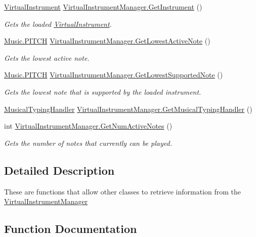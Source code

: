\begin{DoxyCompactItemize}
\hyperlink{class_virtual_instrument}{Virtual\+Instrument} \hyperlink{group___v_i_m_pub_func_gac39a3e411417dc010f0e4fd8f146fbc3}{Virtual\+Instrument\+Manager.\+Get\+Instrument} ()
\begin{DoxyCompactList}\small\item\em Gets the loaded \hyperlink{class_virtual_instrument}{Virtual\+Instrument}. \end{DoxyCompactList}\item 
\hyperlink{group___music_enums_ga508f69b199ea518f935486c990edac1d}{Music.\+P\+I\+T\+CH} \hyperlink{group___v_i_m_pub_func_ga09bfbd0756fc8110c877e5b59c104bcd}{Virtual\+Instrument\+Manager.\+Get\+Lowest\+Active\+Note} ()
\begin{DoxyCompactList}\small\item\em Gets the lowest active note. \end{DoxyCompactList}\item 
\hyperlink{group___music_enums_ga508f69b199ea518f935486c990edac1d}{Music.\+P\+I\+T\+CH} \hyperlink{group___v_i_m_pub_func_gaeb152486450d6c6dc50078e1644c4c6a}{Virtual\+Instrument\+Manager.\+Get\+Lowest\+Supported\+Note} ()
\begin{DoxyCompactList}\small\item\em Gets the lowest note that is supported by the loaded instrument. \end{DoxyCompactList}\item 
\hyperlink{class_musical_typing_handler}{Musical\+Typing\+Handler} \hyperlink{group___v_i_m_pub_func_gae6701458a23a3f14db90501f871d4d0d}{Virtual\+Instrument\+Manager.\+Get\+Musical\+Typing\+Handler} ()
\item 
int \hyperlink{group___v_i_m_pub_func_ga3d6c823b1c1083eac8202f6c89e60b48}{Virtual\+Instrument\+Manager.\+Get\+Num\+Active\+Notes} ()
\begin{DoxyCompactList}\small\item\em Gets the number of notes that currently can be played. \end{DoxyCompactList}\end{DoxyCompactItemize}


\subsection{Detailed Description}
These are functions that allow other classes to retrieve information from the \hyperlink{class_virtual_instrument_manager}{Virtual\+Instrument\+Manager} 

\subsection{Function Documentation}
\mbox{\label{group___v_i_m_pub_func_ga119e0c582106fc9ecc2631e39d71d681}} 
